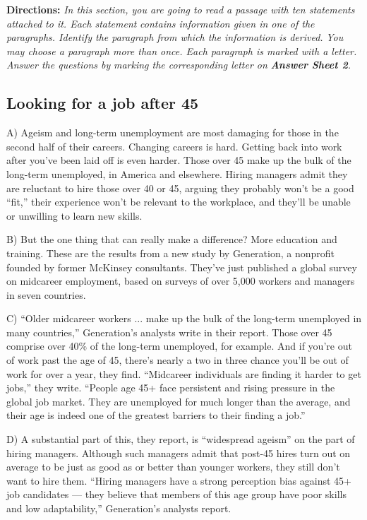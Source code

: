 \documentclass[UTF8,11pt]{ctexart}
\begin{document}
\textbf{Directions:} \textit{In this section, you are going to read a passage with ten statements attached to it. Each statement} \textit{contains information given in one of the paragraphs. Identify the paragraph from which the information is derived.} \textit{You may choose a paragraph more than once. Each paragraph is marked with a letter. Answer the questions by} \textit{marking the corresponding letter on }\textbf{\textit{Answer Sheet 2}}\textit{.}


\subsection*{\textbf{Looking for a job after 45}}


A) Ageism and long-term unemployment are most damaging for those in the second half of their careers. Changing careers is hard. Getting back into work after you’ve been laid off is even harder. Those over 45 make up the bulk of the long-term unemployed, in America and elsewhere. Hiring managers admit they are reluctant to hire those over 40 or 45, arguing they probably won’t be a good “fit,” their experience won’t be relevant to the workplace, and they’ll be unable or unwilling to learn new skills.


B) But the one thing that can really make a difference? More education and training. These are the results from a new study by Generation, a nonprofit founded by former McKinsey consultants. They’ve just published a global survey on midcareer employment, based on surveys of over 5,000 workers and managers in seven countries.


C) “Older midcareer workers ... make up the bulk of the long-term unemployed in many countries,” Generation’s analysts write in their report. Those over 45 comprise over 40\% of the long-term unemployed, for example. And if you’re out of work past the age of 45, there’s nearly a two in three chance you’ll be out of work for over a year, they find. “Midcareer individuals are finding it harder to get jobs,” they write. “People age 45+ face persistent and rising pressure in the global job market. They are unemployed for much longer than the average, and their age is indeed one of the greatest barriers to their finding a job.”


D) A substantial part of this, they report, is “widespread ageism” on the part of hiring managers. Although such managers admit that post-45 hires turn out on average to be just as good as or better than younger workers, they still don’t want to hire them. “Hiring managers have a strong perception bias against 45+ job candidates — they believe that members of this age group have poor skills and low adaptability,” Generation’s analysts report.
\end{document}
